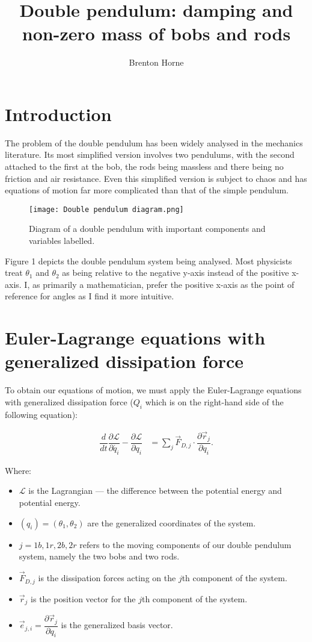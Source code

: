 \documentclass[12pt,a4paper,portrait]{article}
\date{}
\title{Double pendulum: damping and non-zero mass of bobs and rods}
\author{Brenton Horne}
\begin{document}
	\maketitle
	\tableofcontents
	
	\section{Introduction}
	The problem of the double pendulum has been widely analysed in the mechanics literature. Its most simplified version involves two pendulums, with the second attached to the first at the bob, the rods being massless and there being no friction and air resistance. Even this simplified version is subject to chaos and has equations of motion far more complicated than that of the simple pendulum.  
	\begin{figure}[H]
		\centering
		\texttt{[image: Double pendulum diagram.png]}
		\caption{Diagram of a double pendulum with important components and variables labelled.}
	\end{figure}
	Figure 1 depicts the double pendulum system being analysed. Most physicists treat $\theta_1$ and $\theta_2$ as being relative to the negative y-axis instead of the positive x-axis. I, as primarily a mathematician, prefer the positive x-axis as the point of reference for angles as I find it more intuitive. 
	
	\section{Euler-Lagrange equations with generalized dissipation force}
	To obtain our equations of motion, we must apply the Euler-Lagrange equations with generalized dissipation force ($Q_i$ which is on the right-hand side of the following equation):
	
	\begin{align}
		\dfrac{d}{dt}\dfrac{\partial \mathcal{L}}{\partial \dot{q_i}} - \dfrac{\partial \mathcal{L}}{\partial q_i} &=  \sum_j \vec{F}_{D,j} \cdot \dfrac{\partial \vec{r}_j}{\partial q_i}. \label{ELD}
	\end{align}
	
	Where:
	\begin{itemize}
		\item $\mathcal{L}$ is the Lagrangian --- the difference between the potential energy and potential energy. 
		\item $(q_i)=(\theta_1,\theta_2)$ are the generalized coordinates of the system.
		\item $j=1b,1r,2b,2r$ refers to the moving components of our double pendulum system, namely the two bobs and two rods.
		\item $\vec{F}_{D,j}$ is the dissipation forces acting on the $j$th component of the system.
		\item $\vec{r}_j$ is the position vector for the $j$th component of the system.
		\item $\vec{e}_{j,i}=\dfrac{\partial \vec{r}_j}{\partial q_i}$ is the generalized basis vector.
	\end{itemize}
	
\end{document}
